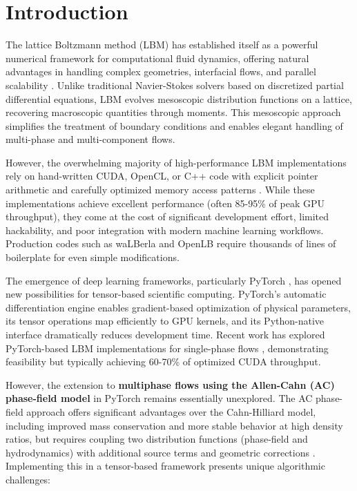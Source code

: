 \section{Introduction}

The lattice Boltzmann method (LBM) has established itself as a powerful numerical framework for computational fluid dynamics, offering natural advantages in handling complex geometries, interfacial flows, and parallel scalability \cite{succi2001lattice}. Unlike traditional Navier-Stokes solvers based on discretized partial differential equations, LBM evolves mesoscopic distribution functions on a lattice, recovering macroscopic quantities through moments. This mesoscopic approach simplifies the treatment of boundary conditions and enables elegant handling of multi-phase and multi-component flows.

However, the overwhelming majority of high-performance LBM implementations rely on hand-written CUDA, OpenCL, or C++ code with explicit pointer arithmetic and carefully optimized memory access patterns \cite{geier2015cumulant, krause2012distributed}. While these implementations achieve excellent performance (often 85-95\% of peak GPU throughput), they come at the cost of significant development effort, limited hackability, and poor integration with modern machine learning workflows. Production codes such as waLBerla \cite{krause2012distributed} and OpenLB \cite{heiselberg2019aplf} require thousands of lines of boilerplate for even simple modifications.

The emergence of deep learning frameworks, particularly PyTorch \cite{paszke2019pytorch}, has opened new possibilities for tensor-based scientific computing. PyTorch's automatic differentiation engine enables gradient-based optimization of physical parameters, its tensor operations map efficiently to GPU kernels, and its Python-native interface dramatically reduces development time. Recent work has explored PyTorch-based LBM implementations for single-phase flows \cite{lykov2022stability, palmer2022scalable}, demonstrating feasibility but typically achieving 60-70\% of optimized CUDA throughput.

However, the extension to \textbf{multiphase flows using the Allen-Cahn (AC) phase-field model} in PyTorch remains essentially unexplored. The AC phase-field approach offers significant advantages over the Cahn-Hilliard model, including improved mass conservation and more stable behavior at high density ratios, but requires coupling two distribution functions (phase-field and hydrodynamics) with additional source terms and geometric corrections \cite{fakhari2017diffuse, lee2010lattice}. Implementing this in a tensor-based framework presents unique algorithmic challenges:

